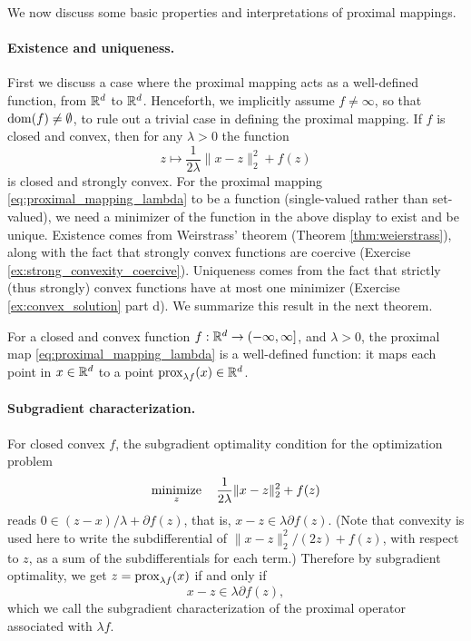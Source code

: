 We now discuss some basic properties and interpretations of proximal mappings. 

\paragraph{Existence and uniqueness.}

First we discuss a case where the proximal mapping acts as a well-defined 
function, from $\mathbb{R}^d$ to $\mathbb{R}^d$. Henceforth, we implicitly assume $f \not=
\infty$, so that $\operatorname{dom}(f) \not= \emptyset$, to rule out a trivial case in
defining the proximal mapping. If $f$ is closed and convex, then for any
$\lambda > 0$ the function  
\[
z \mapsto \frac{1}{2\lambda} \|x - z\|_2^2 + f(z)
\]
is closed and strongly convex. For the proximal mapping
\eqref{eq:proximal_mapping_lambda} to be a function (single-valued rather than
set-valued), we need a minimizer of the function in the above display to exist
and be unique. Existence comes from Weirstrass' theorem (Theorem
\ref{thm:weierstrass}), along with the fact that strongly convex functions are
coercive (Exercise \ref{ex:strong_convexity_coercive}). Uniqueness comes from
the fact that strictly (thus strongly) convex functions have at most one
minimizer (Exercise \ref{ex:convex_solution} part d). We summarize this result
in the next theorem. 

\begin{Theorem}
\label{thm:proximal_existence_uniqueness}
For a closed and convex function $f : \mathbb{R}^d \to (-\infty, \infty]$, and $\lambda
> 0$, the proximal map \eqref{eq:proximal_mapping_lambda} is a well-defined
function: it maps each point in $x \in \mathbb{R}^d$ to a point $\operatorname{prox}_{\lambda f}(x)
\in \mathbb{R}^d$.  
\end{Theorem}
\vspace{-3pt}

\paragraph{Subgradient characterization.}

For closed convex $f$, the subgradient optimality condition for the optimization
problem 
\[
\operatorname*{minimize}_z \quad \frac{1}{2\lambda} \|x - z\|_2^2 + f(z)
\]
reads $0 \in (z - x) / \lambda + \partial f(z)$, that is, $x - z \in \lambda 
\partial f(z)$. (Note that convexity is used here to write the subdifferential
of $\|x - z\|_2^2/(2z) + f(z)$, with respect to $z$, as a sum of the
subdifferentials for each term.) Therefore by subgradient optimality, we get $z
= \operatorname{prox}_{\lambda f}(x)$ if and only if 
\begin{equation}
\label{eq:proximal_subgradient_characterization}
x - z \in \lambda \partial f(z),
\end{equation}
which we call the subgradient characterization of the proximal operator
associated with $\lambda f$. 

